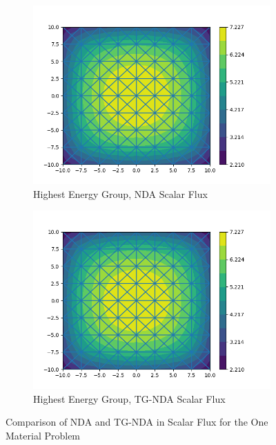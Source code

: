 \begin{figure}[H]
\centering
\begin{subfigure}{.5\textwidth}
  \centering
  \includegraphics[width=\linewidth]{fig/nda_c5g7mod_scalar_flux_group0.png}
  \caption{Highest Energy Group, NDA Scalar Flux}
  \label{fig:NDA-Mod}
\end{subfigure}%
\begin{subfigure}{.5\textwidth}
  \centering
  \includegraphics[width=\linewidth]{fig/tgnda_c5g7mod_scalar_flux_group0.png}
  \caption{Highest Energy Group, TG-NDA Scalar Flux}
  \label{fig:TG-NDA-Mod}
\end{subfigure}
\caption{Comparison of NDA and TG-NDA in Scalar Flux for the One Material Problem}
\label{fig:Moderator}
\end{figure}

